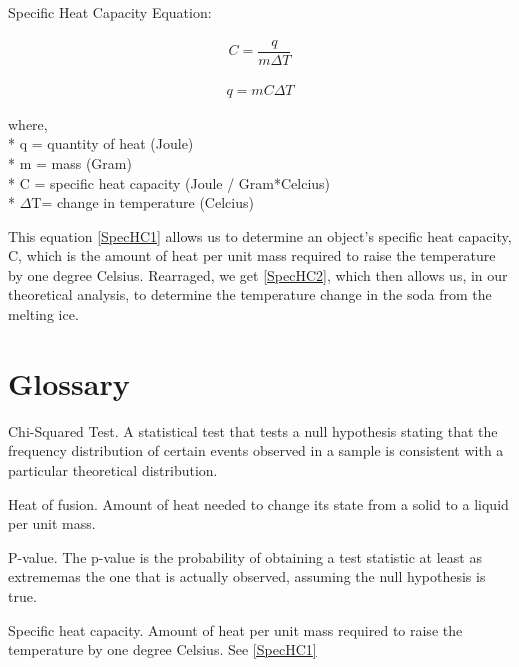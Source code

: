 \documentclass[oneside,12pt]{report}
\begin{document}
Specific Heat Capacity Equation:

\begin{align}
C= \dfrac{q}{m\Delta{}T} 				\label{SpecHC1}
\end{align}

\begin{align}
q=mC\Delta{}T \label{SpecHC2}
\end{align}

\noindent where,
\\* \indent q = quantity of heat (Joule) 
\\* \indent m = mass (Gram)
\\* \indent C = specific heat capacity (Joule / Gram*Celcius)
\\* \indent $\Delta$T= change in temperature (Celcius)

\vspace{24pt}

\noindent This equation \eqref{SpecHC1} allows us to determine an object's specific heat capacity, C, which is the amount of heat per unit mass required to raise the temperature by one degree Celsius. Rearraged, we get \eqref{SpecHC2}, which then allows us, in our theoretical analysis, to determine the temperature change in the soda from the melting ice. 

\chapter{Glossary}\label{Glossary}

\noindent Chi-Squared Test.
\indent A statistical test that tests a null hypothesis stating that the frequency distribution of certain events observed in a sample is consistent with a particular theoretical distribution. 
\vspace{12pt}

\noindent Heat of fusion. 
\indent Amount of heat needed to change its state from a solid to a liquid per unit mass.
\vspace{12pt}

\noindent P-value.
\indent The p-value is the probability of obtaining a test statistic at least as extrememas the one that is actually observed, assuming the null hypothesis is true.
\vspace{12pt}

\noindent Specific heat capacity. 
\indent Amount of heat per unit mass required to raise the temperature by one degree Celsius. See \ref{SpecHC1}
\vspace{12pt}
\end{document}
